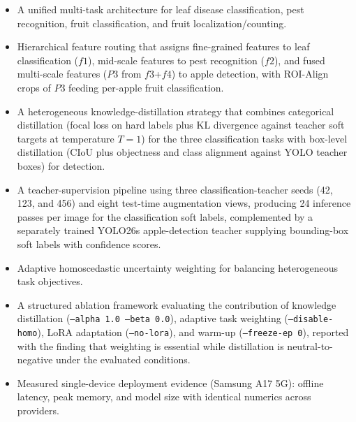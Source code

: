 \documentclass[preprint,12pt]{elsarticle}
\begin{document}
\begin{itemize}

\item A unified multi-task architecture for leaf disease classification,
pest recognition, fruit classification, and fruit localization/counting.

\item Hierarchical feature routing that assigns fine-grained features
to leaf classification ($f1$), mid-scale features to pest recognition
($f2$), and fused multi-scale features ($P3$ from $f3$+$f4$) to apple
detection, with ROI-Align crops of $P3$ feeding per-apple fruit
classification.

\item A heterogeneous knowledge-distillation strategy that combines
categorical distillation (focal loss on hard labels plus KL divergence
against teacher soft targets at temperature $T=1$) for the three
classification tasks with box-level distillation (CIoU plus objectness
and class alignment against YOLO teacher boxes) for detection.

\item A teacher-supervision pipeline using three classification-teacher
seeds (42, 123, and 456) and eight test-time augmentation views,
producing 24 inference passes per image for the classification soft
labels, complemented by a separately trained YOLO26s apple-detection
teacher supplying bounding-box soft labels with confidence scores.

\item Adaptive homoscedastic uncertainty weighting for balancing
heterogeneous task objectives.

\item A structured ablation framework evaluating the contribution of
knowledge distillation (\texttt{--alpha 1.0 --beta 0.0}), adaptive task
weighting (\texttt{--disable-homo}), LoRA adaptation
(\texttt{--no-lora}), and warm-up (\texttt{--freeze-ep 0}), reported
with the finding that weighting is essential while distillation is
neutral-to-negative under the evaluated conditions.

\item Measured single-device deployment evidence (Samsung A17 5G):
offline latency, peak memory, and model size with identical numerics
across providers.

\end{itemize}

\end{document}
